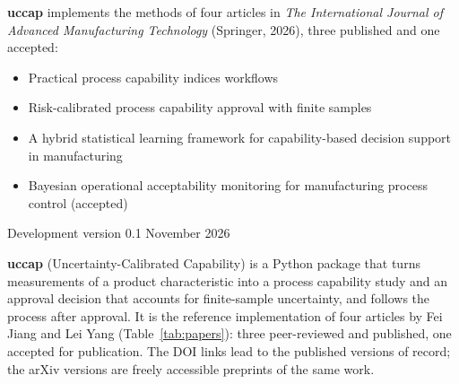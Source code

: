 \documentclass[a4paper,11pt,oneside,openany,parskip=half-,headings=standardclasses,toc=flat,numbers=noenddot]{scrbook}
\newcommand{\pkg}{\textsf{\bfseries uccap}}
\newcommand{\tabref}[1]{Table~\ref{#1}}
\begin{document}
\begin{titlepage}
\vspace{18mm}
\begin{minipage}{0.86\textwidth}
\small\color{ink}
\pkg{} implements the methods of four articles in
\emph{The International Journal of Advanced Manufacturing Technology} (Springer, 2026), three published and one
accepted:
\begin{itemize}[leftmargin=1.2em,itemsep=2pt,topsep=4pt]
\item Practical process capability indices workflows
\item Risk-calibrated process capability approval with finite samples
\item A hybrid statistical learning framework for capability-based decision support in manufacturing
\item Bayesian operational acceptability monitoring for manufacturing process control (accepted)
\end{itemize}
\end{minipage}

\vfill
{\sffamily\footnotesize\color{muted} Development version 0.1 \quad\textbullet\quad November 2026}
\end{titlepage}
\restoregeometry

\frontmatter
\setcounter{page}{2}

\pkg{} (Uncertainty-Calibrated Capability) is a Python package that turns measurements of a
product characteristic into a process capability study and an approval decision that accounts
for finite-sample uncertainty, and follows the process after approval. It is the reference implementation of
four articles by Fei Jiang and Lei Yang (\tabref{tab:papers}): three peer-reviewed and published, one accepted for
publication. The DOI links lead to the published versions of record; the arXiv versions are freely accessible
preprints of the same work.
\end{document}
